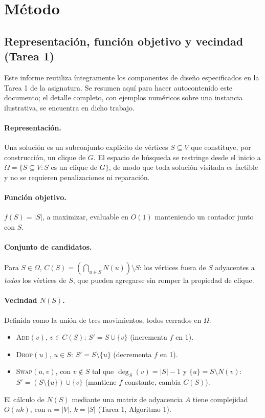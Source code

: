 \section{Método}\label{sec:met2}

\subsection{Representación, función objetivo y vecindad (Tarea 1)}\label{subsec:recap_t1}

Este informe reutiliza íntegramente los componentes de diseño especificados en la Tarea 1 de la asignatura. Se resumen aquí para hacer autocontenido este documento; el detalle completo, con ejemplos numéricos sobre una instancia ilustrativa, se encuentra en dicho trabajo.

\paragraph{Representación.} Una solución es un subconjunto explícito de vértices $S \subseteq V$ que constituye, por construcción, un clique de $G$. El espacio de búsqueda se restringe desde el inicio a $\Omega = \{S \subseteq V : S \text{ es un clique de } G\}$, de modo que toda solución visitada es factible y no se requieren penalizaciones ni reparación.

\paragraph{Función objetivo.} $f(S) = |S|$, a maximizar, evaluable en $O(1)$ manteniendo un contador junto con $S$.

\paragraph{Conjunto de candidatos.} Para $S\in\Omega$, $C(S) = \left(\bigcap_{u\in S} N(u)\right)\setminus S$: los vértices fuera de $S$ adyacentes a \emph{todos} los vértices de $S$, que pueden agregarse sin romper la propiedad de clique.

\paragraph{Vecindad $N(S)$.} Definida como la unión de tres movimientos, todos cerrados en $\Omega$:
\begin{itemize}
    \item \textsc{Add}$(v)$, $v\in C(S)$: $S' = S\cup\{v\}$ (incrementa $f$ en 1).
    \item \textsc{Drop}$(u)$, $u\in S$: $S'=S\setminus\{u\}$ (decrementa $f$ en 1).
    \item \textsc{Swap}$(u,v)$, con $v\notin S$ tal que $\deg_S(v)=|S|-1$ y $\{u\}=S\setminus N(v)$: $S'=(S\setminus\{u\})\cup\{v\}$ (mantiene $f$ constante, cambia $C(S)$).
\end{itemize}
El cálculo de $N(S)$ mediante una matriz de adyacencia $A$ tiene complejidad $O(nk)$, con $n=|V|$, $k=|S|$ (Tarea 1, Algoritmo 1).

